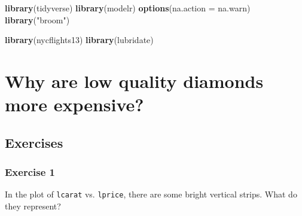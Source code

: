\documentclass[]{book}
\newenvironment{Shaded}{\begin{snugshade}}{\end{snugshade}}
\newcommand{\DataTypeTok}[1]{\textcolor[rgb]{0.13,0.29,0.53}{#1}}
\newcommand{\FloatTok}[1]{\textcolor[rgb]{0.00,0.00,0.81}{#1}}
\newcommand{\KeywordTok}[1]{\textcolor[rgb]{0.13,0.29,0.53}{\textbf{#1}}}
\newcommand{\NormalTok}[1]{#1}
\newcommand{\OperatorTok}[1]{\textcolor[rgb]{0.81,0.36,0.00}{\textbf{#1}}}
\newcommand{\StringTok}[1]{\textcolor[rgb]{0.31,0.60,0.02}{#1}}
\theoremstyle{plain}
\theoremstyle{remark}
\theoremstyle{definition}
\theoremstyle{definition}
\theoremstyle{definition}
\theoremstyle{remark}
\begin{document}
\begin{Shaded}
\begin{Highlighting}[]
\KeywordTok{library}\NormalTok{(tidyverse)}
\KeywordTok{library}\NormalTok{(modelr)}
\KeywordTok{options}\NormalTok{(}\DataTypeTok{na.action =}\NormalTok{ na.warn)}
\KeywordTok{library}\NormalTok{(}\StringTok{"broom"}\NormalTok{)}

\KeywordTok{library}\NormalTok{(nycflights13)}
\KeywordTok{library}\NormalTok{(lubridate)}
\end{Highlighting}
\end{Shaded}

\hypertarget{why-are-low-quality-diamonds-more-expensive}{%
\section{Why are low quality diamonds more
expensive?}\label{why-are-low-quality-diamonds-more-expensive}}

\begin{Shaded}
\end{Shaded}

\hypertarget{exercises-2}{%
\subsection{Exercises}\label{exercises-2}}

\hypertarget{exercise-1-65}{%
\subsubsection{Exercise 1}\label{exercise-1-65}}

In the plot of \texttt{lcarat} vs. \texttt{lprice}, there are some
bright vertical strips. What do they represent?
\end{document}
